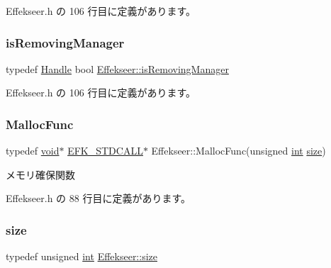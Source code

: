  Effekseer.\+h の 106 行目に定義があります。

\mbox{\label{namespace_effekseer_a153d1bcf5fd3c14124e04d0dadf6827c}} 
\subsubsection{\texorpdfstring{is\+Removing\+Manager}{isRemovingManager}}
{\footnotesize\ttfamily typedef \mbox{\hyperlink{namespace_effekseer_afba58b8d812da862190e9bbfc040824a}{Handle}} bool \mbox{\hyperlink{namespace_effekseer_a153d1bcf5fd3c14124e04d0dadf6827c}{Effekseer\+::is\+Removing\+Manager}}}



 Effekseer.\+h の 106 行目に定義があります。

\mbox{\label{namespace_effekseer_a2f9a04a7b2d08a8f2173ce47e57ff742}} 
\subsubsection{\texorpdfstring{Malloc\+Func}{MallocFunc}}
{\footnotesize\ttfamily typedef \mbox{\hyperlink{namespace_effekseer_ab34c4088e512200cf4c2716f168deb56}{void}}$\ast$ \mbox{\hyperlink{_effekseer_8h_a4b2fd0bd069299f55649055bbd485d7f}{E\+F\+K\+\_\+\+S\+T\+D\+C\+A\+LL}}$\ast$ Effekseer\+::\+Malloc\+Func(unsigned \mbox{\hyperlink{namespace_effekseer_ace0abf7c2e6947e519ebe8b54cbcc30a}{int}} \mbox{\hyperlink{namespace_effekseer_a73c68f3d33539d30844b9d1e058077f7}{size}})}



メモリ確保関数 



 Effekseer.\+h の 88 行目に定義があります。

\mbox{\label{namespace_effekseer_a73c68f3d33539d30844b9d1e058077f7}} 
\subsubsection{\texorpdfstring{size}{size}}
{\footnotesize\ttfamily typedef unsigned \mbox{\hyperlink{namespace_effekseer_ace0abf7c2e6947e519ebe8b54cbcc30a}{int}} \mbox{\hyperlink{namespace_effekseer_a73c68f3d33539d30844b9d1e058077f7}{Effekseer\+::size}}}



